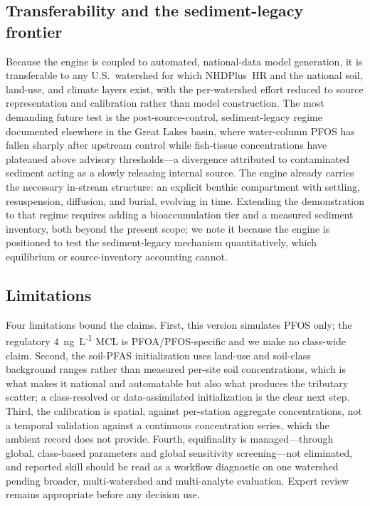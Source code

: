 \subsection{Transferability and the sediment-legacy frontier}
Because the engine is coupled to automated, national-data model generation, it is transferable to any U.S.\ watershed for which NHDPlus~HR and the national soil, land-use, and climate layers exist, with the per-watershed effort reduced to source representation and calibration rather than model construction. The most demanding future test is the post-source-control, sediment-legacy regime documented elsewhere in the Great Lakes basin, where water-column PFOS has fallen sharply after upstream control while fish-tissue concentrations have plateaued above advisory thresholds---a divergence attributed to contaminated sediment acting as a slowly releasing internal source. The engine already carries the necessary in-stream structure: an explicit benthic compartment with settling, resuspension, diffusion, and burial, evolving in time. Extending the demonstration to that regime requires adding a bioaccumulation tier and a measured sediment inventory, both beyond the present scope; we note it because the engine is positioned to test the sediment-legacy mechanism quantitatively, which equilibrium or source-inventory accounting cannot.

\subsection{Limitations}
Four limitations bound the claims. First, this version simulates PFOS only; the regulatory $4$~ng~L\textsuperscript{-1} MCL is PFOA/PFOS-specific and we make no class-wide claim. Second, the soil-PFAS initialization uses land-use and soil-class background ranges rather than measured per-site soil concentrations, which is what makes it national and automatable but also what produces the tributary scatter; a class-resolved or data-assimilated initialization is the clear next step. Third, the calibration is spatial, against per-station aggregate concentrations, not a temporal validation against a continuous concentration series, which the ambient record does not provide. Fourth, equifinality is managed---through global, class-based parameters and global sensitivity screening---not eliminated, and reported skill should be read as a workflow diagnostic on one watershed pending broader, multi-watershed and multi-analyte evaluation. Expert review remains appropriate before any decision use.
